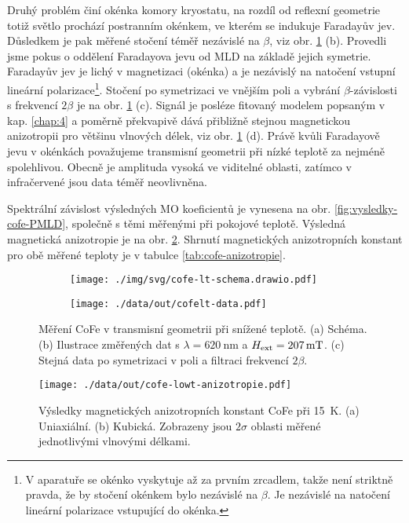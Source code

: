 Druhý problém činí okénka komory kryostatu, na rozdíl od reflexní geometrie totiž světlo prochází postranním okénkem, ve kterém se indukuje Faradayův jev.
Důsledkem je pak měřené stočení téměř nezávislé na $\beta$, viz obr. \ref{fig:vysledky-cofe-lowt-schema-data} (b).
Provedli jsme pokus o oddělení Faradayova jevu od MLD na základě jejich symetrie.
Faradayův jev je lichý v magnetizaci (okénka) a je nezávislý na natočení vstupní lineární polarizace\footnote{V aparatuře se okénko vyskytuje až za prvním zrcadlem, takže není striktně pravda, že by stočení okénkem bylo nezávislé na $\beta$. Je nezávislé na natočení lineární polarizace vstupující do okénka.}.
Stočení po symetrizaci ve vnějším poli a vybrání $\beta$-závislosti s frekvencí $2\beta$ je na obr. \ref{fig:vysledky-cofe-lowt-schema-data} (c).
Signál je posléze fitovaný modelem popsaným v kap. \ref{chap:4} a poměrně překvapivě dává přibližně stejnou magnetickou anizotropii pro většinu vlnových délek, viz obr. \ref{fig:vysledky-cofe-lowt-schema-data} (d).
Právě kvůli Faradayově jevu v okénkách považujeme transmisní geometrii při nízké teplotě za nejméně spolehlivou.
Obecně je amplituda vysoká ve viditelné oblasti, zatímco v infračervené jsou data téměř neovlivněna.

Spektrální závislost výsledných MO koeficientů je vynesena na obr. \ref{fig:vysledky-cofe-PMLD}, společně s těmi měřenými při pokojové teplotě.
Výsledná magnetická anizotropie je na obr. \ref{fig:vysledky-cofe-lowt-anizotropie}.
Shrnutí magnetických anizotropních konstant pro obě měřené teploty je v tabulce \ref{tab:cofe-anizotropie}.

\begin{figure}[htbp]
    \centering
    \begin{subfigure}{.3\textwidth}
        \centering
        \texttt{[image: ./img/svg/cofe-lt-schema.drawio.pdf]}
    \end{subfigure}
    \begin{subfigure}{.67\textwidth}
        \centering
        \texttt{[image: ./data/out/cofelt-data.pdf]}
    \end{subfigure}
    \caption{Měření CoFe v transmisní geometrii při snížené teplotě. (a) Schéma. (b) Ilustrace změřených dat s $\lambda=\SI{620}{\nano\meter}$ a $H_\textrm{ext}=\SI{207}{\milli\tesla}$. (c) Stejná data po symetrizaci v poli a filtraci frekvencí $2\beta$.}
    \label{fig:vysledky-cofe-lowt-schema-data}
\end{figure}

\begin{figure}[htbp]
    \centering
    \texttt{[image: ./data/out/cofe-lowt-anizotropie.pdf]}
    \caption{Výsledky magnetických anizotropních konstant CoFe při \SI{15}{\kelvin}. (a) Uniaxiální. (b) Kubická. Zobrazeny jsou $2\sigma$ oblasti měřené jednotlivými vlnovými délkami.}
    \label{fig:vysledky-cofe-lowt-anizotropie}
\end{figure}

